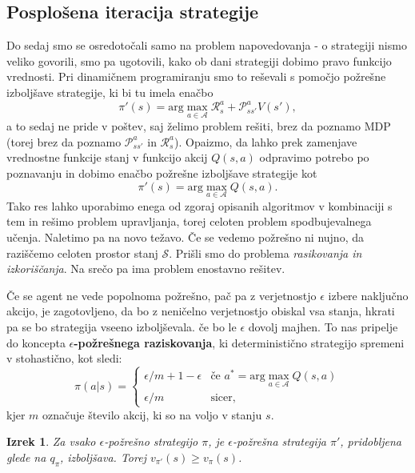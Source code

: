 \documentclass[12pt,a4paper]{amsart}
\theoremstyle{definition} %
\theoremstyle{plain} %
\newtheorem{izrek}[definicija]{Izrek}
\begin{document}
\subsection{Posplošena iteracija strategije}
Do sedaj smo se osredotočali samo na problem napovedovanja - o strategiji nismo veliko govorili, 
smo pa ugotovili, kako ob dani strategiji dobimo pravo funkcijo vrednosti. Pri dinamičnem 
programiranju smo to reševali s pomočjo požrešne izboljšave strategije, ki bi tu imela enačbo
$$
\pi'(s) = \text{arg}\max_{a \in \mathcal{A}} \mathcal{R}_s^a + \mathcal{P}_{ss'}^a V(s'),
$$
a to sedaj ne pride v poštev, saj želimo problem rešiti, brez da poznamo MDP (torej brez da 
poznamo $\mathcal{P}_{ss'}^a$ in $\mathcal{R}_s^a$). Opaizmo, da lahko prek zamenjave vrednostne 
funkcije stanj v funkcijo akcij $Q(s, a)$ odpravimo potrebo po poznavanju in dobimo enačbo požrešne
izboljšave strategije kot 
\begin{equation}\label{PIS}
    \pi'(s) = \text{arg}\max_{a \in \mathcal{A}} Q(s, a).
\end{equation}
Tako res lahko uporabimo enega od zgoraj opisanih algoritmov v kombinaciji s tem in rešimo problem 
upravljanja, torej celoten problem spodbujevalnega učenja. Naletimo pa na novo težavo. Če se vedemo
požrešno ni nujno, da raziščemo celoten prostor stanj $\mathcal{S}$. Prišli smo do problema 
\textit{rasikovanja in izkoriščanja}. Na srečo pa ima problem enostavno rešitev. 

Če se agent ne vede popolnoma požrešno, pač pa z verjetnostjo $\epsilon$ izbere naključno akcijo, 
je zagotovljeno, da bo z neničelno verjetnostjo obiskal vsa stanja, hkrati pa se bo strategija 
vseeno izboljševala. če bo le $\epsilon$ dovolj majhen. To nas pripelje do koncepta \textbf{
$\epsilon$-požrešnega raziskovanja}, ki deterministično strategijo spremeni v stohastično, kot
sledi:
\begin{equation}
    \pi(a|s) = \begin{cases}
                \epsilon / m + 1 - \epsilon & \text{če } a^* = \text{arg}\max_{a \in 
                    \mathcal{A}} Q(s, a) \\
                    \epsilon / m & \text{sicer},
               \end{cases}
\end{equation}
kjer $m$ označuje število akcij, ki so na voljo v stanju $s$.

\begin{izrek}
    Za vsako $\epsilon$-požrešno strategijo $\pi$, je $\epsilon$-požrešna strategija $\pi'$, 
    pridobljena glede na $q_\pi$, izboljšava. Torej $v_{\pi'}(s) \geq v_\pi(s)$. 
\end{izrek}
\end{document}
